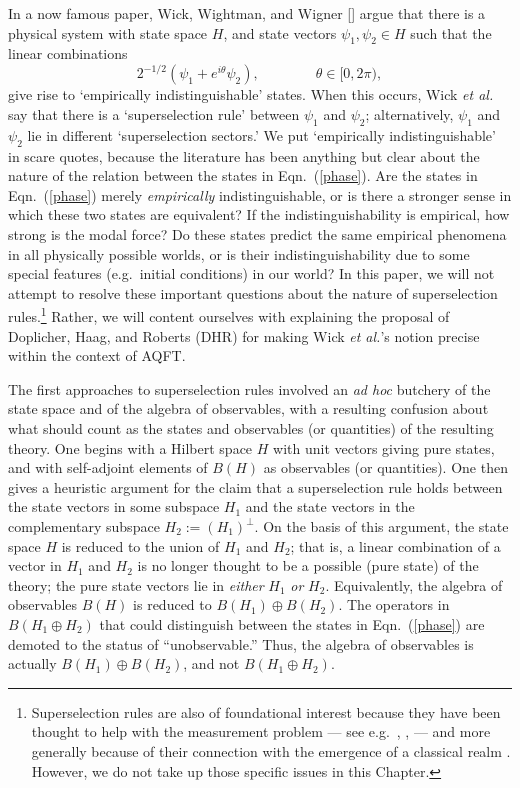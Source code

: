 \documentclass[11pt]{article}
\theoremstyle{definition}
\theoremstyle{definition}
\theoremstyle{remark}
\newcommand{\et}{\textit{et al.} }
\begin{document}
In a now famous paper, Wick, Wightman, and Wigner
[\citeyear{www}] argue that there is a physical system
with state space $H$, and state vectors $\psi _1,\psi
_2 \in H$ such that the linear combinations
\begin{equation} 2^{-1/2}(\psi _1+e^{i\theta }\psi _2 ), \qquad \qquad
  \theta \in [0,2\pi ) , \label{phase} \end{equation} give rise to
`empirically indistinguishable' states.  When this occurs, Wick \et
say that there is a `superselection rule' between $\psi _1$ and $\psi
_2$; alternatively, $\psi _1$ and $\psi _2$ lie in different
`superselection sectors.'  We put `empirically indistinguishable' in
scare quotes, because the literature has been anything but clear about
the nature of the relation between the states in Eqn.\ (\ref{phase}).
Are the states in Eqn.\ (\ref{phase}) merely \emph{empirically}
indistinguishable, or is there a stronger sense in which these two
states are equivalent?  If the indistinguishability is empirical, how
strong is the modal force?  Do these states predict the same empirical
phenomena in all physically possible worlds, or is their
indistinguishability due to some special features (e.g.\ initial
conditions) in our world?  In this paper, we will not attempt to
resolve these important questions about the nature of superselection
rules.\footnote{Superselection rules are also of foundational interest
  because they have been thought to help with the measurement problem
  --- see e.g.\ \cite[p.\ 74]{belt}, \cite{klaas}, \cite[pp.\
  264--272]{bas} --- and more generally because of their connection
  with the emergence of a classical realm \cite{giul}.  However, we do
  not take up those specific issues in this Chapter.}  Rather, we will
content ourselves with explaining the proposal of Doplicher, Haag, and
Roberts (DHR) for making Wick \textit{et al.}'s notion precise within
the context of AQFT.

The first approaches to superselection rules involved
an \textit{ad hoc} butchery of the state space and of
the algebra of observables, with a resulting confusion
about what should count as the states and observables
(or quantities) of the resulting theory.  One begins
with a Hilbert space $H$ with unit vectors giving pure
states, and with self-adjoint elements of $B(H)$ as
observables (or quantities).  One then gives a
heuristic argument for the claim that a superselection
rule holds between the state vectors in some subspace
$H _1$ and the state vectors in the complementary
subspace $H_2:=(H _1)^{\perp}$.  On the basis of this
argument, the state space $H$ is reduced to the union
of $H_1$ and $H_2$; that is, a linear combination of a
vector in $H _1$ and $H _2$ is no longer thought to be
a possible (pure state) of the theory; the pure state
vectors lie in \emph{either} $H_1$ \emph{or} $H _2$.
Equivalently, the algebra of observables $B(H)$ is
reduced to $B(H _1)\oplus B(H _2)$.  The operators in
$B(H_1\oplus H_2)$ that could distinguish between the
states in Eqn.\ (\ref{phase}) are demoted to the status
of ``unobservable.''  Thus, the algebra of observables
is actually $B(H _1)\oplus B(H _2)$, and not
$B(H_1\oplus H_2)$.
\end{document}
